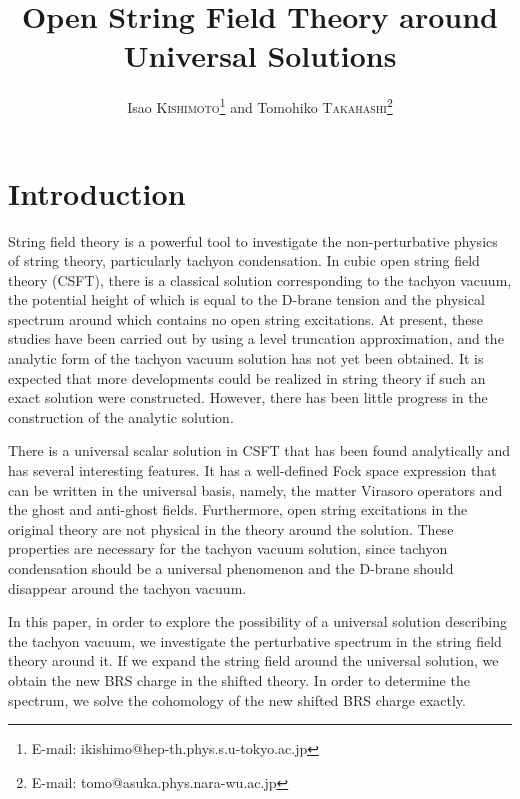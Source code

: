 \documentclass[a4paper,seceq,preprint]{ptptex}
\title{%
Open String Field Theory around Universal Solutions
}
\author{%
Isao \textsc{Kishimoto}\myHighlight{$^{1,}$}\coordHE{}\footnote{
E-mail: ikishimo@hep-th.phys.s.u-tokyo.ac.jp} %
and Tomohiko \textsc{Takahashi}\myHighlight{$^{2,}$}\coordHE{}\footnote{
E-mail: tomo@asuka.phys.nara-wu.ac.jp} %
}
\begin{document}
\maketitle

\section{Introduction}
String field theory is a powerful tool to investigate the non-perturbative
physics of string theory, particularly 
tachyon condensation.
In cubic open string field theory (CSFT),\cite{rf:CSFT}
there is a classical solution corresponding to the tachyon
vacuum,\cite{rf:SZ-tachyon} the potential height of which is equal to the
D-brane tension and 
the physical spectrum around which contains no open string
excitations.\cite{rf:Sen,rf:Ohmori} 
At present, these studies have been carried out
by using a level truncation approximation, and the analytic form of the
tachyon vacuum solution has not yet been
obtained.\cite{rf:KS-tachyon,rf:SZ-tachyon,rf:MT,rf:ET}
It is expected that
more developments could be realized in string theory if such an
exact solution were constructed. However, there has been little progress in
the construction of the analytic
solution.\cite{rf:KP,rf:Schnabl1,rf:TT,rf:TT2,rf:KishiOhmo,rf:Kluson}

There is a universal scalar solution in CSFT that has been found
analytically and has several interesting features.\cite{rf:TT2}
It has a well-defined Fock space expression that can be written in the
universal basis, namely, the matter Virasoro operators and the ghost and
anti-ghost fields. 
Furthermore, open string excitations in the original theory are 
not physical in the theory around the solution. These properties are
necessary for the tachyon vacuum solution, since
tachyon condensation should be  a universal
phenomenon\cite{rf:SZ-tachyon,rf:SenUniv} and the D-brane should disappear
around the tachyon vacuum.\cite{rf:Sen,rf:ET,rf:HT}

In this paper, in order to explore the possibility of a universal
solution describing the tachyon vacuum, we investigate the
perturbative spectrum in the string 
field  theory around it. 
If we expand the string field around the universal solution, we obtain
the new BRS charge in the shifted theory. In order to determine the
spectrum, we solve the cohomology of the new shifted BRS
charge exactly. 
\end{document}
